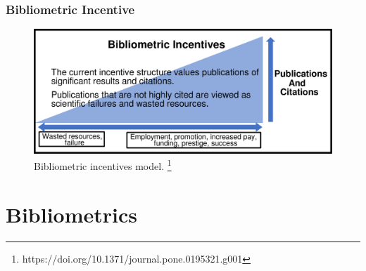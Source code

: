 \documentclass{beamer}
\begin{document}
\begin{frame}

    \frametitle{Bibliometric Incentive}

    \begin{figure}[h]
        \includegraphics[height=0.5\textheight]{1.png}
        \caption{Bibliometric incentives model. \footnote{https://doi.org/10.1371/journal.pone.0195321.g001}}
    \end{figure}

\end{frame}

\section{Bibliometrics}

\end{document}
